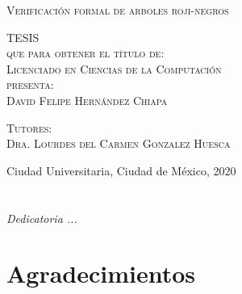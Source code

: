 \documentclass[8pt,leqno,pdflatex,spanish]{book}
\theoremstyle{plain}
\theoremstyle{definition}
\theoremstyle{remark}
\begin{document}
\begin{titlepage}
\begin{minipage}[c][0.81\textheight][t]{0.75\textwidth}
\begin{center}
{\large\scshape Verificación formal de arboles roji-negros}\\[.2in]

\vspace{2cm}            

\textsc{\LARGE T\hspace{1.5cm}E\hspace{1.5cm}S\hspace{1.5cm}I\hspace{1.5cm}S}\\[0.5cm]
\textsc{\large que para obtener el t\'itulo de:}\\[0.5cm]
\textsc{\large Licenciado en Ciencias de la Computación}\\[0.5cm]
\textsc{\large presenta:}\\[0.5cm]
\textsc{\large {David Felipe Hern\'andez Chiapa}}\\[2cm]          

\vspace{0.5cm}

{\large\scshape Tutores:\\[0.3cm] {Dra. Lourdes del Carmen Gonzalez Huesca}}\\[.2in]

\vspace{0.5cm}

\large{Ciudad Universitaria, Ciudad de México,}{ }{2020}
\end{center}
\end{minipage}
\end{titlepage}



\frontmatter
\chapter*{}
\begin{flushright}%
\emph{Dedicatoria ...}
\thispagestyle{empty}
\end{flushright}

\chapter{Agradecimientos}

\tableofcontents
\listoffigures


\mainmatter
\end{document}
